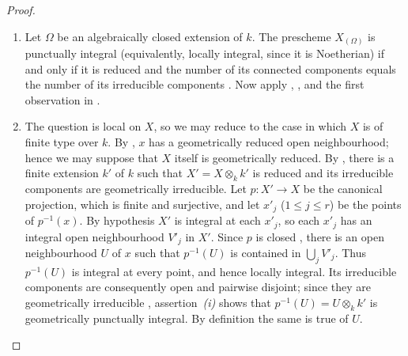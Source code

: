 \begin{proof}
\begin{enumerate}
\item[\rm(i)]
Let $\Omega$ be an algebraically closed extension of $k$.
The prescheme $X_{(\Omega)}$ is punctually integral
(equivalently, locally integral, since it is Noetherian) if and only
if it is reduced and the number of its connected components equals
the number of its irreducible components .
Now apply , , and the first observation
in .

\item[\rm(ii)]
The question is local on $X$, so we may reduce to the case in which
$X$ is of finite type over $k$.
By , $x$ has a geometrically reduced open
neighbourhood; hence we may suppose that $X$ itself is geometrically
reduced.
By , there is a finite extension $k'$ of $k$ such that
$X'=X\otimes_k k'$ is reduced and its irreducible components are
geometrically irreducible.
Let $p:X'\to X$ be the canonical projection, which is finite and
surjective, and let $x'_j$ ($1\leq j\leq r$) be the points of
$p^{-1}(x)$.
By hypothesis $X'$ is integral at each $x'_j$, so each $x'_j$ has an
integral open neighbourhood $V'_j$ in $X'$.
Since $p$ is closed , there is an open
neighbourhood $U$ of $x$ such that $p^{-1}(U)$ is contained in
$\bigcup_jV'_j$.
Thus $p^{-1}(U)$ is integral at every point, and hence locally
integral.
Its irreducible components are consequently open and pairwise
disjoint; since they are geometrically irreducible
, assertion~\emph{(i)} shows that
$p^{-1}(U)=U\otimes_k k'$ is geometrically punctually integral.
By definition the same is true of $U$.
\end{enumerate}
\end{proof}

